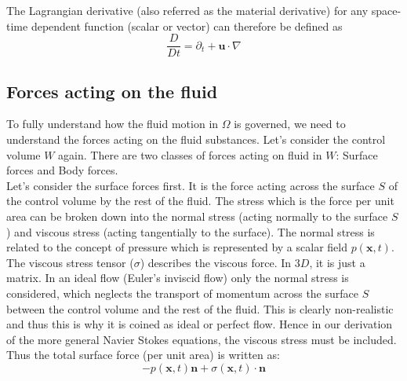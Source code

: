 The Lagrangian derivative (also referred as the material derivative) for any space-time dependent function (scalar or vector) can therefore be defined as \cite{chorin1968numerical}
\begin{equation}
\dfrac{D}{D t} = \partial_t + \textbf{u} \cdot \nabla
\end{equation}

\subsection{Forces acting on the fluid}
To fully understand how the fluid motion in $\Omega$ is governed, we need to understand the forces acting on the fluid substances. Let's consider the control volume $W$ again. There are two classes of forces acting on fluid in $W$: Surface forces and Body forces.\\

Let's consider the surface forces first. It is the force acting across the surface $S$ of the control volume by the rest of the fluid. The stress which is the force per unit area can be broken down into the normal stress (acting normally to the surface $S$) and viscous stress (acting tangentially to the surface). The normal stress is related to the concept of pressure which is represented by a scalar field $p(\textbf{x},t)$. The viscous stress tensor ($\textbf{$\sigma$}$) describes the viscous force. In $3D$, it is just a matrix. In an ideal flow (Euler's inviscid flow) only the normal stress is considered, which neglects the transport of momentum across the surface $S$ between the control volume and the rest of the fluid. This is clearly non-realistic and thus this is why it is coined as ideal or perfect flow. Hence in our derivation of the more general Navier Stokes equations, the viscous stress must be included. Thus the total surface force (per unit area) is written as:
\begin{equation}
- p(\textbf{x},t) \textbf{n} + \textbf{$\sigma$} (\textbf{x},t)\cdot \textbf{n}
\end{equation}

